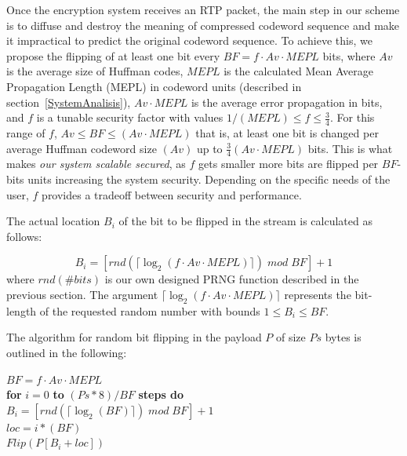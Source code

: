 \documentclass[preprint]{elsarticle}
\begin{document}
Once the encryption system receives an RTP packet, the main step in our scheme is to diffuse and destroy the meaning of compressed codeword sequence and make it impractical to predict the original codeword sequence. To achieve this, we propose the flipping of at least one bit every $BF= f \cdot Av \cdot MEPL$ bits, where $Av$ is the average size of Huffman codes, $MEPL$ is the calculated Mean Average Propagation Length (MEPL) in codeword units  (described in section~\ref{SystemAnalisis}), $ Av \cdot MEPL$ is the average error propagation in bits, and $f$ is a tunable security factor with values $1/(MEPL) \leq f \leq \frac{3}{4}$. For this range of $f$, $Av \leq BF \leq (Av \cdot MEPL)$ that is, at least one bit is changed per average Huffman codeword size $(Av)$ up to $\frac{3}{4}(Av \cdot MEPL)$ bits. This is what makes \textit{our system scalable secured}, as $f$ gets smaller more bits are flipped per $BF$-bits units increasing the system security. Depending on the specific needs of the user, $f$ provides a tradeoff between security and
performance.

The actual location $B_{i}$ of the bit to be flipped in the stream is calculated as follows:

\begin{equation}
B_{i}= \left[ rnd(  \lceil   \log_{2}(f \cdot Av \cdot MEPL)  \rceil )\; mod\; BF   \right] +1
\label{ec7}
\end{equation}
where $rnd(\#bits)$ is our own designed PRNG function described in the previous section. The argument 
$\lceil   \log_{2}(f \cdot Av \cdot MEPL)  \rceil$ represents the bit-length of the requested random
number with bounds $1 \leq B_{i} \leq BF$.

The algorithm for random bit flipping in the payload $P$ of size $Ps$ bytes is outlined in the following:

\noindent \hspace*{30mm} $BF= f \cdot Av \cdot MEPL$ \\
\hspace*{30mm} \textbf{for} $i=0$ \textbf{to} $(Ps \ast 8)/BF$ \textbf{steps do} \\
\hspace*{35mm} $B_{i}=\left[ rnd(  \lceil   \log_{2}(BF)  \rceil )\; mod\; BF   \right] +1 $ \\
\hspace*{35mm} $loc = i \ast (BF)$ \\
\hspace*{35mm} $Flip(P[B_{i} + loc])$ 
\end{document}
